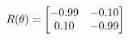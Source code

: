 \documentclass[preview]{standalone}
\begin{document}
\begin{align*}
\special{dvisvgm:raw <g id='unique000'>}R(\theta) = \begin{bmatrix}-0.99 & -0.10\\0.10 & -0.99\end{bmatrix}\special{dvisvgm:raw </g>}
\end{align*}
\end{document}
